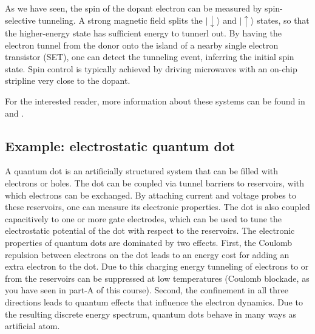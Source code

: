 \documentclass[a4paper,11pt]{article}
\newcommand{\ket}[1]{| #1 \rangle}
\begin{document}
As we have seen, the spin of the dopant electron can be measured by spin-selective tunneling. A strong magnetic field splits the $\ket{\downarrow}$ and $\ket{\uparrow}$ states, so that the higher-energy state has sufficient energy to tunnerl out. By having the electron tunnel from the donor onto the island of a nearby single electron transistor (SET), one can detect the tunneling event, inferring the initial spin state. Spin control is typically achieved by driving microwaves with an on-chip stripline very close to the dopant.

For the interested reader, more information about these systems can be found in  \cite{morton_embracing_2011} and \cite{zwanenburg_silicon_2013}.

\subsection {Example: electrostatic quantum dot}
A quantum dot is an artificially structured system that can be filled with electrons or holes. The dot can be coupled via tunnel barriers to reservoirs, with which electrons can be exchanged. By attaching current and voltage probes to these reservoirs, one can measure its electronic properties. The dot is also coupled capacitively to one or more gate electrodes, which can be used to tune the electrostatic potential of the dot with respect to the reservoirs.
\newline The electronic properties of quantum dots are dominated by two effects. First, the Coulomb repulsion between electrons on the dot leads to an energy cost for adding an extra electron to the dot. Due to this charging energy tunneling of electrons to or from the reservoirs can be suppressed at low temperatures (Coulomb blockade, as you have seen in part-A of this course). Second, the confinement in all three directions leads to quantum effects that influence the electron dynamics. Due to the resulting discrete energy spectrum, quantum dots behave in many ways as artificial atom.
\end{document}
